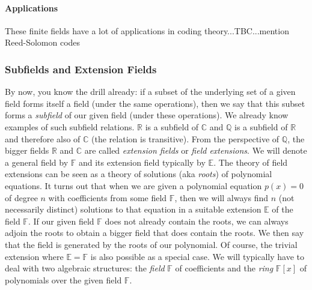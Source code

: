 



\paragraph{Applications}
These finite fields have a lot of applications in coding theory...TBC...mention Reed-Solomon codes



\subsubsection{Subfields and Extension Fields}
By now, you know the drill already: if a subset of the underlying set of a given field forms itself a field (under the same operations), then we say that this subset forms a \emph{subfield} of our given field (under these operations). We already know examples of such subfield relations. $\mathbb{R}$ is a subfield of $\mathbb{C}$ and $\mathbb{Q}$ is a subfield of $\mathbb{R}$ and therefore also of $\mathbb{C}$ (the relation is transitive). From the perspective of $\mathbb{Q}$, the bigger fields $\mathbb{R}$ and $\mathbb{C}$ are called \emph{extension fields} or \emph{field extensions}. We will denote a general field by $\mathbb{F}$ and its extension field typically by $\mathbb{E}$. The theory of field extensions can be seen as a theory of solutions (aka \emph{roots}) of polynomial equations. It turns out that when we are given a polynomial equation $p(x) = 0$ of degree $n$ with coefficients from some field $\mathbb{F}$, then we will always find $n$ (not necessarily distinct) solutions to that equation in a suitable extension $\mathbb{E}$ of the field $\mathbb{F}$. If our given field $\mathbb{F}$ does not already contain the roots, we can always adjoin the roots to obtain a bigger field that does contain the roots. We then say that the field is generated by the roots of our polynomial. Of course, the trivial extension where $\mathbb{E} = \mathbb{F}$ is also possible as a special case. We will typically have to deal with two algebraic structures: the \emph{field} $\mathbb{F}$ of coefficients and the \emph{ring} $\mathbb{F}[x]$ of polynomials over the given field $\mathbb{F}$.

